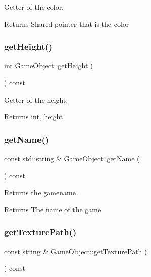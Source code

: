 Getter of the color. 

\begin{DoxyReturn}{Returns}
Shared pointer that is the color 
\end{DoxyReturn}
\mbox{\label{classGameObject_a6aac91785cfba6631668db216235c79e}} 
\subsubsection{\texorpdfstring{get\+Height()}{getHeight()}}
{\footnotesize\ttfamily int Game\+Object\+::get\+Height (\begin{DoxyParamCaption}{ }\end{DoxyParamCaption}) const}



Getter of the height. 

\begin{DoxyReturn}{Returns}
int, height 
\end{DoxyReturn}
\mbox{\label{classGameObject_a72c04187da1840a922b7cbafa12e4882}} 
\subsubsection{\texorpdfstring{get\+Name()}{getName()}}
{\footnotesize\ttfamily const std\+::string \& Game\+Object\+::get\+Name (\begin{DoxyParamCaption}{ }\end{DoxyParamCaption}) const}



Returns the gamename. 

\begin{DoxyReturn}{Returns}
The name of the game 
\end{DoxyReturn}
\mbox{\label{classGameObject_a008037b2f4572fe79d38d5abea5b1058}} 
\subsubsection{\texorpdfstring{get\+Texture\+Path()}{getTexturePath()}}
{\footnotesize\ttfamily const string \& Game\+Object\+::get\+Texture\+Path (\begin{DoxyParamCaption}{ }\end{DoxyParamCaption}) const}



